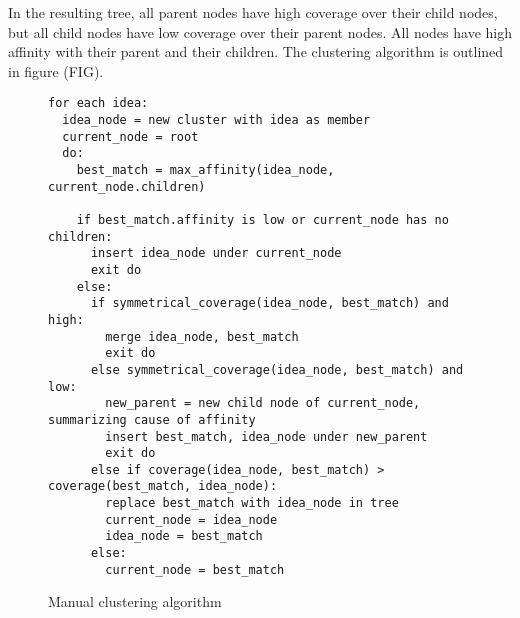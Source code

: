 In the resulting tree, all parent nodes have high coverage over their child nodes, but all child nodes have low coverage over their parent nodes. All nodes have high affinity with their parent and their children. The clustering algorithm is outlined in figure (FIG).

\begin{figure*}[h]
\begin{verbatim}
for each idea:
  idea_node = new cluster with idea as member
  current_node = root
  do:
    best_match = max_affinity(idea_node, current_node.children)

    if best_match.affinity is low or current_node has no children:
      insert idea_node under current_node
      exit do
    else:
      if symmetrical_coverage(idea_node, best_match) and high:
        merge idea_node, best_match
        exit do
      else symmetrical_coverage(idea_node, best_match) and low:
        new_parent = new child node of current_node, summarizing cause of affinity
        insert best_match, idea_node under new_parent
        exit do
      else if coverage(idea_node, best_match) > coverage(best_match, idea_node):
        replace best_match with idea_node in tree
        current_node = idea_node
        idea_node = best_match
      else:
        current_node = best_match
\end{verbatim}
\caption{Manual clustering algorithm}
\label{fig:cluseringalg}
\end{figure*}